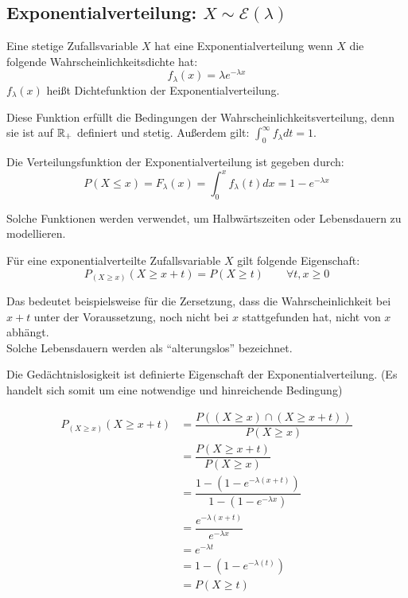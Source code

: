 \documentclass[../MAIN/main.tex]{subfiles}
\begin{document}
\subsection{Exponentialverteilung: $X \sim \mathcal{E}(\lambda)$}
\begin{Definition}
  Eine stetige Zufallsvariable $X$ hat eine Exponentialverteilung wenn $X$ die folgende Wahrscheinlichkeitsdichte hat:
  $$f_\lambda (x) = \lambda e^{-\lambda x}$$
  $f_\lambda(x)$ heißt Dichtefunktion der Exponentialverteilung.
\end{Definition}
\begin{Bemerkung}
  Diese Funktion erfüllt die Bedingungen der Wahrscheinlichkeitsverteilung, denn sie ist auf $\mathbb{R}_{+}$ definiert und stetig. Außerdem gilt: $\displaystyle \int_0^\infty f_\lambda dt = 1$.
\end{Bemerkung}
\begin{Definition}
  Die Verteilungsfunktion der Exponentialverteilung ist gegeben durch:
  $$P(X \leq x) = F_\lambda(x) = \int_{0}^{x} f_\lambda(t) dx = 1 - e^{-\lambda x}$$
\end{Definition}
\begin{Bemerkung}
  Solche Funktionen werden verwendet, um Halbwärtszeiten oder Lebensdauern zu modellieren.
\end{Bemerkung}
\begin{Theorem}[- Gedächtnislosigkeit]
  Für eine exponentialverteilte Zufallsvariable $X$ gilt folgende Eigenschaft:
  $$P_{(X \geq x)}(X \geq x+t) = P(X \geq t)\qquad \forall t,x \geq 0$$
\end{Theorem}
\begin{Bemerkung}
  Das bedeutet beispielsweise für die Zersetzung, dass die Wahrscheinlichkeit bei $x+t$ unter der Voraussetzung, noch nicht bei $x$ stattgefunden hat, nicht von $x$ abhängt.\\
  Solche Lebensdauern werden als ``alterungslos'' bezeichnet.
\end{Bemerkung}
\begin{Bemerkung}
  Die Gedächtnislosigkeit ist definierte Eigenschaft der Exponentialverteilung. (Es handelt sich somit um eine notwendige und hinreichende Bedingung)
\end{Bemerkung}
\begin{Beweis}
  \begin{align*}
    P_{(X \geq x)}(X \geq x+t) &= \dfrac{P((X \geq x)\cap(X \geq x+t))}{P(X \geq x)}\\
    &= \dfrac{P(X \geq x+t)}{P(X \geq x)}\\
    &= \dfrac{1-(1-e^{-\lambda(x+t)})}{1-(1-e^{-\lambda x})}\\
    &= \dfrac{e^{-\lambda(x+t)}}{e^{-\lambda x}}\\
    &= e^{-\lambda t}\\
    &= 1-(1-e^{-\lambda(t)})\\
    &= P(X \geq t)
  \end{align*}
\end{Beweis}
\end{document}
